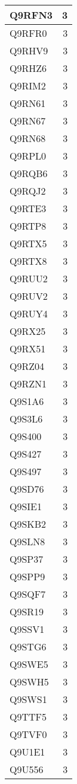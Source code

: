 \documentclass[
]{book}
\theoremstyle{definition}
\theoremstyle{definition}
\theoremstyle{definition}
\theoremstyle{definition}
\theoremstyle{remark}
\begin{document}
\begin{table}
\begin{tabular}{l|r}
\hline
Q9RFN3 & 3\\
\hline
Q9RFR0 & 3\\
\hline
Q9RHV9 & 3\\
\hline
Q9RHZ6 & 3\\
\hline
Q9RIM2 & 3\\
\hline
Q9RN61 & 3\\
\hline
Q9RN67 & 3\\
\hline
Q9RN68 & 3\\
\hline
Q9RPL0 & 3\\
\hline
Q9RQB6 & 3\\
\hline
Q9RQJ2 & 3\\
\hline
Q9RTE3 & 3\\
\hline
Q9RTP8 & 3\\
\hline
Q9RTX5 & 3\\
\hline
Q9RTX8 & 3\\
\hline
Q9RUU2 & 3\\
\hline
Q9RUV2 & 3\\
\hline
Q9RUY4 & 3\\
\hline
Q9RX25 & 3\\
\hline
Q9RX51 & 3\\
\hline
Q9RZ04 & 3\\
\hline
Q9RZN1 & 3\\
\hline
Q9S1A6 & 3\\
\hline
Q9S3L6 & 3\\
\hline
Q9S400 & 3\\
\hline
Q9S427 & 3\\
\hline
Q9S497 & 3\\
\hline
Q9SD76 & 3\\
\hline
Q9SIE1 & 3\\
\hline
Q9SKB2 & 3\\
\hline
Q9SLN8 & 3\\
\hline
Q9SP37 & 3\\
\hline
Q9SPP9 & 3\\
\hline
Q9SQF7 & 3\\
\hline
Q9SR19 & 3\\
\hline
Q9SSV1 & 3\\
\hline
Q9STG6 & 3\\
\hline
Q9SWE5 & 3\\
\hline
Q9SWH5 & 3\\
\hline
Q9SWS1 & 3\\
\hline
Q9TTF5 & 3\\
\hline
Q9TVF0 & 3\\
\hline
Q9U1E1 & 3\\
\hline
Q9U556 & 3\\

\end{tabular}
\end{table}
\end{document}
